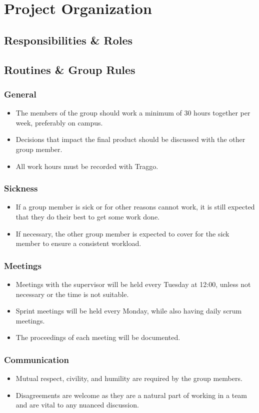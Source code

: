 \section{Project Organization}
\subsection{Responsibilities \& Roles}
\begin{comment}
    Erik communications
    Simon møtereferattaker
    Eller har vi samme responsabilities & roles, 
\end{comment}

\subsection{Routines \& Group Rules}
\subsubsection{General}
\begin{itemize}
    \item The members of the group should work a minimum of 30 hours together per week, preferably on campus.
    \item Decisions that impact the final product should be discussed with the other group member.
    \item All work hours must be recorded with Traggo.
\end{itemize}

\subsubsection{Sickness}
\begin{itemize}
    \item If a group member is sick or for other reasons cannot work, it is still expected that they do their best to get some work done.
    \item If necessary, the other group member is expected to cover for the sick member to ensure a consistent workload.
\end{itemize}

\subsubsection{Meetings}
\begin{itemize}
    \item Meetings with the supervisor will be held every Tuesday at 12:00, unless not necessary or the time is not suitable.
    \item Sprint meetings will be held every Monday, while also having daily scrum meetings.
    \item The proceedings of each meeting will be documented.
\end{itemize}

\subsubsection{Communication}
\begin{itemize}
    \item Mutual respect, civility, and humility are required by the group members.
    \item Disagreements are welcome as they are a natural part of working in a team and are vital to any nuanced discussion.
\end{itemize}